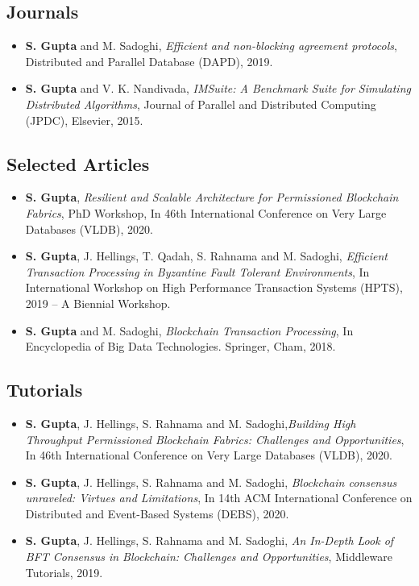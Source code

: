 \documentclass[10pt]{article}
\begin{document}
\subsection*{Journals}
\begin{itemize}
\itemsep-0.2em

\item {\bf S. Gupta} and M. Sadoghi, {\em Efficient and non-blocking agreement protocols}, Distributed and Parallel Database (DAPD), 2019.

\item {\bf S. Gupta} and V. K. Nandivada, {\em IMSuite: A Benchmark Suite for Simulating Distributed Algorithms}, Journal of Parallel and Distributed Computing (JPDC), Elsevier, 2015.
\end{itemize}

\subsection*{Selected Articles}
\begin{itemize}
\itemsep-0.2em

\item {\bf S. Gupta}, {\em Resilient and Scalable Architecture for Permissioned Blockchain Fabrics}, PhD Workshop, 
In 46th International Conference on Very Large Databases (VLDB), 2020.

\item {\bf S. Gupta}, J. Hellings, T. Qadah, S. Rahnama and M. Sadoghi, {\em Efficient Transaction Processing in Byzantine Fault Tolerant Environments}, In International Workshop on High Performance Transaction Systems (HPTS), 2019 -- A Biennial Workshop.

\item {\bf S. Gupta} and M. Sadoghi, {\em Blockchain Transaction Processing}, In Encyclopedia of Big Data Technologies. Springer, Cham, 2018.
\end{itemize}


\subsection*{Tutorials}
\begin{itemize}
\itemsep-0.2em

\item {\bf S. Gupta}, J. Hellings, S. Rahnama and M. Sadoghi,{\em Building High Throughput Permissioned Blockchain Fabrics: Challenges and Opportunities}, In 46th International Conference on Very Large Databases (VLDB), 2020.

\item {\bf S. Gupta}, J. Hellings, S. Rahnama and M. Sadoghi, {\em Blockchain consensus unraveled: Virtues and Limitations}, In 14th ACM International Conference on Distributed and Event-Based Systems (DEBS), 2020.

\item {\bf S. Gupta}, J. Hellings, S. Rahnama and M. Sadoghi, {\em An In-Depth Look of BFT Consensus in Blockchain: Challenges and Opportunities}, Middleware Tutorials, 2019.
\end{itemize}
\end{document}
